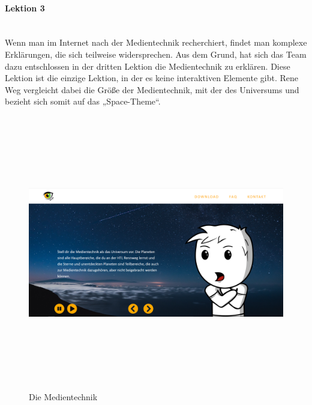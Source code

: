 \paragraph{Lektion 3} \leavevmode \\
Wenn man im Internet nach der Medientechnik recherchiert, findet man komplexe Erklärungen, die sich teilweise widersprechen. Aus dem Grund, hat sich das Team dazu entschlossen in der dritten Lektion die Medientechnik zu erklären. Diese Lektion ist die einzige Lektion, in der es keine interaktiven Elemente gibt. Rene Weg vergleicht dabei die Größe der Medientechnik, mit der des Universums und bezieht sich somit auf das „Space-Theme“. 
\begin{figure}[h]
	\centering
\includegraphics[width=12cm,height=12cm,keepaspectratio]{webseite_abb14} 
	\caption{Die Medientechnik}
\end{figure}

